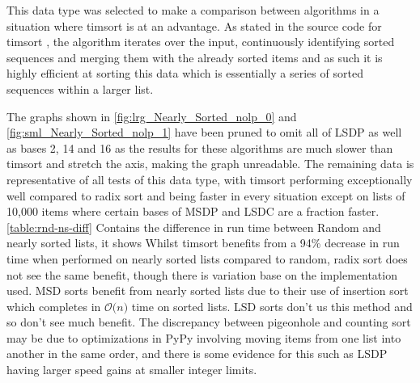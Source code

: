\documentclass[12pt]{article}
\begin{document}
	This data type was selected to make a comparison between algorithms in a situation where timsort is at an advantage. As stated in the source code for timsort \cite{listsort}, the algorithm iterates over the input, continuously identifying sorted sequences and merging them with the already sorted items and as such it is highly efficient at sorting this data which is essentially a series of sorted sequences within a larger list.
	\par
	The graphs shown in \autoref{fig:lrg_Nearly_Sorted_nolp_0} and \autoref{fig:sml_Nearly_Sorted_nolp_1} have been pruned to omit all of LSD\textunderscore P as well as bases 2, 14 and 16 as the results for these algorithms are much slower than timsort and stretch the axis, making the graph unreadable. The remaining data is representative of all tests of this data type, with timsort performing exceptionally well compared to radix sort and being faster in every situation except on lists of 10,000 items where certain bases of MSD\textunderscore P and LSD\textunderscore C are a fraction faster.  	
	\autoref{table:rnd-ns-diff} Contains the difference in run time between Random and nearly sorted lists, it shows Whilst timsort benefits from a 94\% decrease in run time when performed on nearly sorted lists compared to random, radix sort does not see the same benefit, though there is variation base on the implementation used. MSD sorts benefit from nearly sorted lists due to their use of insertion sort which completes in $\mathcal{O}\textit{(n)}$ time on sorted lists. LSD sorts don't us this method and so don't see much benefit. The discrepancy between pigeonhole and counting sort may be due to optimizations in PyPy involving moving items from one list into another in the same order, and there is some evidence for this such as LSD\textunderscore P having larger speed gains at smaller integer limits.
	
\end{document}
